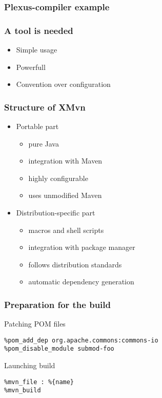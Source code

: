 \documentclass[pdftex,unicode,xcolor=table]{beamer}
\begin{document}
\begin{frame}
  \frametitle{Plexus-compiler example}
\end{frame}

\begin{frame}
  \frametitle{A tool is needed}
  \begin{itemize}
    \item Simple usage
    \item Powerfull
    \item Convention over configuration
  \end{itemize}
\end{frame}

\begin{frame}
  \frametitle{Structure of XMvn}
  \begin{itemize}
    \item Portable part
    \begin{itemize}
      \item pure Java
      \item integration with Maven
      \item highly configurable
      \item uses unmodified Maven
    \end{itemize}
    \item Distribution-specific part
    \begin{itemize}
      \item macros and shell scripts
      \item integration with package manager
      \item follows distribution standards
      \item automatic dependency generation
    \end{itemize}
  \end{itemize}
\end{frame}


\begin{frame}[fragile]
  \frametitle{Preparation for the build}
  \begin{block}{Patching POM files}
    \scriptsize
\begin{verbatim}
%pom_add_dep org.apache.commons:commons-io
%pom_disable_module submod-foo
\end{verbatim}
  \end{block}
  \begin{block}{Launching build}
    \scriptsize
\begin{verbatim}
%mvn_file : %{name}
%mvn_build
\end{verbatim}
  \end{block}
\end{frame}
\end{document}
